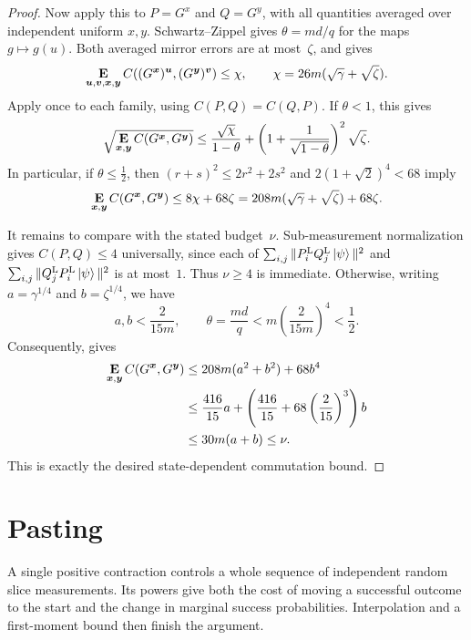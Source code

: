 \documentclass[11pt]{article}
\theoremstyle{definition}
\newcommand{\E}{\mathop{\bf E\/}}
\newcommand{\bu}{\boldsymbol{u}}
\newcommand{\bv}{\boldsymbol{v}}
\newcommand{\bx}{{\boldsymbol{x}}}
\newcommand{\by}{\boldsymbol{y}}
\begin{document}
\begin{proof}
Now apply this to $P=G^x$ and $Q=G^y$, with all quantities averaged
over independent uniform $x,y$.  Schwartz--Zippel gives
$\theta=md/q$ for the maps $g\mapsto g(u)$.
Both averaged mirror errors are at most~$\zeta$, and
 gives
\begin{equation}\label{eq:com-main-evaluated-commutativity}
 \E_{\bu,\bv,\bx,\by}C((G^{\bx})^{\bu},(G^{\by})^{\bv})
 \leq\chi,
 \qquad \chi=26m(\sqrt\gamma+\sqrt\zeta).
\end{equation}
Apply  once to each family,
using $C(P,Q)=C(Q,P)$.  If $\theta<1$, this gives
\begin{equation}\label{eq:commutation-two-sided-lifting}
 \sqrt{\E_{\bx,\by}C(G^{\bx},G^{\by})}
 \leq\frac{\sqrt\chi}{1-\theta}
 +\left(1+\frac1{\sqrt{1-\theta}}\right)^2\sqrt\zeta.
\end{equation}
In particular, if $\theta\leq\tfrac12$, then
$(r+s)^2\leq2r^2+2s^2$ and
$2(1+\sqrt2)^4<68$ imply
\begin{equation}\label{eq:commutation-code-distance-bound}
 \E_{\bx,\by}C(G^{\bx},G^{\by})
 \leq8\chi+68\zeta
 =208m(\sqrt\gamma+\sqrt\zeta)+68\zeta.
\end{equation}

It remains to compare with the stated budget~$\nu$.
Sub-measurement normalization gives $C(P,Q)\leq4$ universally,
since each of
$\sum_{i,j}\|P_i^{\mathrm L}Q_j^{\mathrm L}\ket\psi\|^2$ and
$\sum_{i,j}\|Q_j^{\mathrm L}P_i^{\mathrm L}\ket\psi\|^2$
is at most~$1$.  Thus $\nu\geq4$ is immediate.
Otherwise, writing $a=\gamma^{1/4}$ and $b=\zeta^{1/4}$, we have
\[
 a,b<\frac2{15m},\qquad
 \theta=\frac{md}{q}
 <m\left(\frac2{15m}\right)^4<\frac12.
\]
Consequently,  gives
\begin{align*}
 \E_{\bx,\by}C(G^{\bx},G^{\by})
 &\leq208m(a^2+b^2)+68b^4\\
 &\leq\frac{416}{15}a
   +\left(\frac{416}{15}+68\left(\frac2{15}\right)^3\right)b\\
 &\leq30m(a+b)\leq\nu.
\end{align*}
This is exactly the desired state-dependent commutation bound.
\end{proof}

\section{Pasting}\label{sec:ld-pasting}

A single positive contraction controls a whole sequence of independent
random slice measurements.  Its powers give both the cost of moving a
successful outcome to the start and the change in marginal success
probabilities.  Interpolation and a first-moment bound then finish the
argument.
\end{document}
